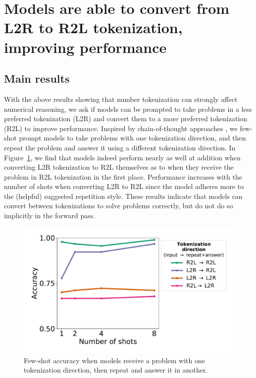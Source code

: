 \documentclass{article}
\theoremstyle{plain}
\theoremstyle{definition}
\theoremstyle{remark}
\begin{document}
\section{Models are able to convert from L2R to R2L tokenization, improving performance}
\label{sec:repeat_experiments}

\subsection{Main results}
\label{sec:repeat_experiments_main_results}

With the above results showing that number tokenization can strongly affect numerical reasoning, we ask if models can be prompted to take problems in a less preferred tokenization (L2R) and convert them to a more preferred tokenization (R2L) to improve performance. Inspired by chain-of-thought approaches \cite{nye2021scratchpad, kojima2022cot, wei2022cot}, we few-shot prompt models to take problems with one tokenization direction, and then repeat the problem and answer it using a different tokenization direction. In Figure~\ref{fig:repeat_style}, we find that models indeed perform nearly as well at addition when converting L2R tokenization to R2L themselves as to when they receive the problem in R2L tokenization in the first place. Performance increases with the number of shots when converting L2R to R2L since the model adheres more to the (helpful) suggested repetition style. These results indicate that models can convert between tokenizations to solve problems correctly, but do not do so implicitly in the forward pass.

\begin{figure}[ht]
    \centering
    \vspace{-1em}
    \includegraphics[width=\columnwidth]{figures/repeat_style.pdf}
    \vspace{-3em}
    \caption{Few-shot accuracy when models receive a problem with one tokenization direction, then repeat and answer it in another.}
    \vspace{-1em}
    \label{fig:repeat_style}
\end{figure}
\end{document}
